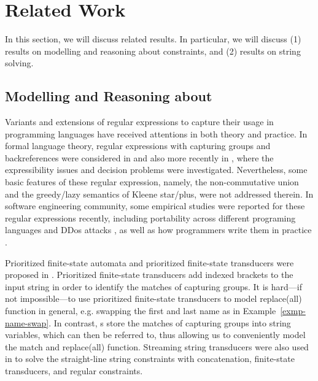 \section{Related Work}
\label{sec-related}

In this section, we will discuss related results. In particular, we will discuss
(1) results on modelling and reasoning about 
\regexp{} constraints, and (2) results on string solving.


\subsection{Modelling and Reasoning about \regexp{}}

Variants and extensions of regular expressions to capture their usage in programming languages have received attentions %
in both theory and practice. In formal language theory, regular expressions with capturing groups and backreferences were considered in \cite{CSY03,CN09} and also more recently in \cite{Freydenberger13,Schmid16,BM17b,FS19}, where the expressibility issues and decision problems were investigated. Nevertheless, some basic features of these regular expression, namely, the non-commutative union and the greedy/lazy semantics of Kleene star/plus, were not addressed therein. In software engineering community, %
some empirical studies were reported for these regular expressions recently, including portability across different programing languages \cite{DMC+19} and DDos attacks \cite{SP18}, as well as how programmers write them in practice \cite{MDD+19}.


Prioritized finite-state automata and prioritized finite-state transducers were proposed in \cite{BM17}. Prioritized finite-state transducers add indexed brackets to the input string in order to identify the matches of capturing groups. It is hard---if not impossible---to use prioritized finite-state transducers to model replace(all) function in general, e.g. swapping the first and last name as in Example~\ref{exmp-name-swap}. In contrast, {\PSST}s store the matches of capturing groups into string variables, which can then be referred to, thus allowing us to conveniently model the match and replace(all) function. 
%
Streaming string transducers were also used in \cite{ZAM19} to solve the straight-line string constraints with concatenation, finite-state transducers, and regular constraints.

